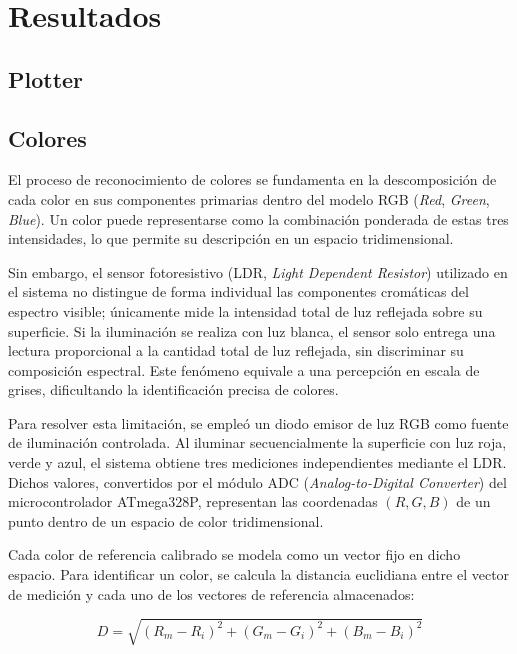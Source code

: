 \section{Resultados}
\subsection{Plotter}
\subsection{Colores}


El proceso de reconocimiento de colores se fundamenta en la descomposición de cada color en sus componentes primarias dentro del modelo RGB (\textit{Red}, \textit{Green}, \textit{Blue}). Un color puede representarse como la combinación ponderada de estas tres intensidades, lo que permite su descripción en un espacio tridimensional.  

\vspace{1em}

Sin embargo, el sensor fotoresistivo (LDR, \textit{Light Dependent Resistor}) utilizado en el sistema no distingue de forma individual las componentes cromáticas del espectro visible; únicamente mide la intensidad total de luz reflejada sobre su superficie. Si la iluminación se realiza con luz blanca, el sensor solo entrega una lectura proporcional a la cantidad total de luz reflejada, sin discriminar su composición espectral. Este fenómeno equivale a una percepción en escala de grises, dificultando la identificación precisa de colores.

\vspace{1em}

Para resolver esta limitación, se empleó un diodo emisor de luz RGB como fuente de iluminación controlada. Al iluminar secuencialmente la superficie con luz roja, verde y azul, el sistema obtiene tres mediciones independientes mediante el LDR. Dichos valores, convertidos por el módulo ADC (\textit{Analog-to-Digital Converter}) del microcontrolador ATmega328P, representan las coordenadas $(R, G, B)$ de un punto dentro de un espacio de color tridimensional.

\vspace{1em}

Cada color de referencia calibrado se modela como un vector fijo en dicho espacio. Para identificar un color, se calcula la distancia euclidiana entre el vector de medición y cada uno de los vectores de referencia almacenados:

\begin{equation}\label{eq:distancia_color}
D = \sqrt{(R_m - R_i)^2 + (G_m - G_i)^2 + (B_m - B_i)^2}
\end{equation}

